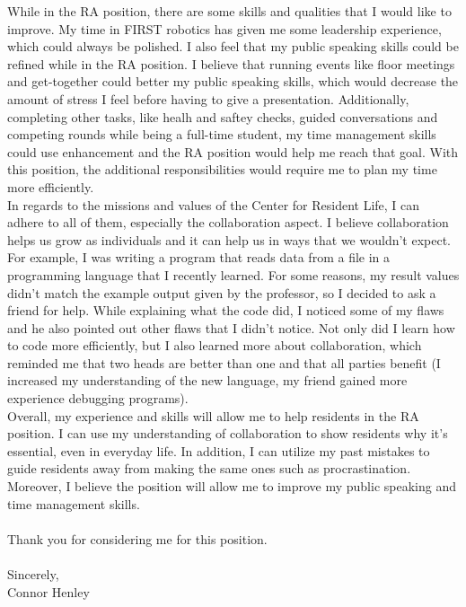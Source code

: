 \documentclass[line,margin]{res}
\begin{document}
\begin{resume}
\begin{adjustwidth}{-92pt}{0pt}
\hspace{20pt}While in the RA position, there are some skills and qualities that I would like to improve. My time in FIRST robotics has given me some leadership experience, which could always be polished. I also feel that my public speaking skills could be refined while in the RA position. I believe that running events like floor meetings and get-together could better my public speaking skills, which would decrease the amount of stress I feel before having to give a presentation. Additionally, completing other tasks, like healh and saftey checks, guided conversations and competing rounds while being a full-time student, my time management skills could use enhancement and the RA position would help me reach that goal. With this position, the additional responsibilities would require me to plan my time more efficiently.\\

\hspace{20pt}In regards to the missions and values of the Center for Resident Life, I can adhere to all of them, especially the collaboration aspect. I believe collaboration helps us grow as individuals and it can help us in ways that we wouldn’t expect. For example, I was writing a program that reads data from a file in a programming language that I recently learned. For some reasons, my result values didn’t match the example output given by the professor, so I decided to ask a friend for help. While explaining what the code did, I noticed some of my flaws and he also pointed out other flaws that I didn’t notice. Not only did I learn how to code more efficiently, but I also learned more about collaboration, which reminded me that two heads are better than one and that all parties benefit (I increased my understanding of the new language, my friend gained more experience debugging programs). \\

\hspace{20pt}Overall, my experience and skills will allow me to help residents in the RA position. I can use my understanding of collaboration to show residents why it’s essential, even in everyday life. In addition, I can utilize my past mistakes to guide residents away from making the same ones such as procrastination.  Moreover, I believe the position will allow me to improve my public speaking and time management skills. 
\\
\\
Thank you for considering me for this position.
\\
\\
Sincerely,
\\
Connor Henley
\end{adjustwidth}
\end{resume}
\end{document}
